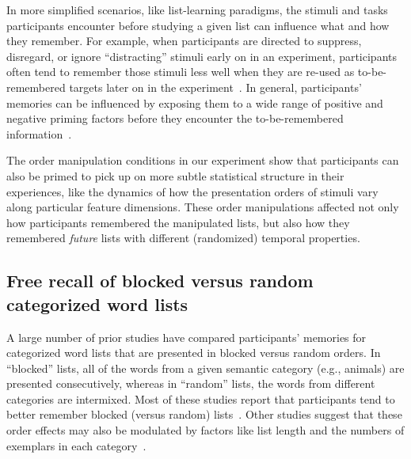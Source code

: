 \documentclass[11pt]{article}
\begin{document}
In more simplified scenarios, like list-learning paradigms, the stimuli and
tasks participants encounter before studying a given list can influence what
and how they remember. For example, when participants are directed to suppress,
disregard, or ignore ``distracting'' stimuli early on in an experiment,
participants often tend to remember those stimuli less well when they are
re-used as to-be-remembered targets later on in the experiment~\citep{Tipp85}.
In general, participants' memories can be influenced by exposing them to a wide
range of positive and negative priming factors before they encounter the
to-be-remembered information~\citep{BaloEtal92, ClayChat89, Donn88, FlexTulv82,
GottEtal12, HuanEtal04, Hube08, HubeEtal01, McNa94, Neel77, Rabi86, TulvScha91,
WatkEtal92, WiggMart98}.

The order manipulation conditions in our experiment show that participants can
also be primed to pick up on more subtle statistical structure in their
experiences, like the dynamics of how the presentation orders of stimuli vary
along particular feature dimensions. These order manipulations affected not
only how participants remembered the manipulated lists, but also how they
remembered \textit{future} lists with different (randomized) temporal
properties.

\subsection*{Free recall of blocked versus random categorized word lists}

A large number of prior studies have compared participants' memories for
categorized word lists that are presented in blocked versus random orders. In
``blocked'' lists, all of the words from a given semantic category (e.g.,
animals) are presented consecutively, whereas in ``random'' lists, the words
from different categories are intermixed. Most of these studies report that
participants tend to better remember blocked (versus random)
lists~\citep{CofeEtal66, DAgo69, Dall64, Shap70, ShapPale70, Kint70,
BoweEtal69, LuekEtal71, Puff74}. Other studies suggest that these order
effects may also be modulated by factors like list length and the numbers of
exemplars in each category~\citep[e.g.,][]{BorgMang72}.
\end{document}
